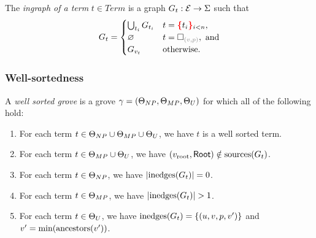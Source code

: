 \begin{definition}
  The \emph{ingraph of a term} $t \in Term$ is a graph $G_t : \E \rightarrow \Sigma$ such that
  \[
    G_t =
    \begin{cases}
      \bigcup_{t_i} G_{t_i} & t = \conflictHole[i < n]{t_i}, \\
      \varnothing & t = \emptyHole{v}{p}, \text{ and} \\
      G_{v_t} & \text{otherwise.} \\
    \end{cases}
  \]
\end{definition}


\subsubsection{Well-sortedness}

\begin{definition}
  A \emph{well sorted grove} is a grove $\gamma = (\Set[NP], \Set[MP], \Set[U])$ for which all of the following hold:
  \begin{enumerate}
    \item For each term $t \in \Set[NP] \cup \Set[MP] \cup \Set[U]$, we have $t$ is a well sorted term.
    \item For each term $t \in \Set[MP] \cup \Set[U]$, we have $(\rootVertex, \Root) \notin \sources{G_t}$.
    \item For each term $t \in \Set[NP]$, we have $\SizeOf{\inedges{G_t}} = 0$.
    \item For each term $t \in \Set[MP]$, we have $\SizeOf{\inedges{G_t}} > 1$.
    \item For each term $t \in \Set[U]$, we have $\inedges{G_t} = \SetOf{(u, v, p, v')}$ and $v' = \min{\ancestors{v'}}$.
  \end{enumerate}
\end{definition}

